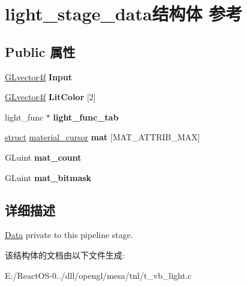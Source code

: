 \hypertarget{structlight__stage__data}{}\section{light\+\_\+stage\+\_\+data结构体 参考}
\label{structlight__stage__data}
\subsection*{Public 属性}
\begin{DoxyCompactItemize}
\item 
\mbox{\label{structlight__stage__data_a8602898d18646f1e2b4eff0319ef4824}} 
\hyperlink{struct_g_lvector4f}{G\+Lvector4f} {\bfseries Input}
\item 
\mbox{\label{structlight__stage__data_a7f84f92269f45218e3ca5165f1d1a837}} 
\hyperlink{struct_g_lvector4f}{G\+Lvector4f} {\bfseries Lit\+Color} \mbox{[}2\mbox{]}
\item 
\mbox{\label{structlight__stage__data_ae8553a68070798719b935d733bfb014d}} 
light\+\_\+func $\ast$ {\bfseries light\+\_\+func\+\_\+tab}
\item 
\mbox{\label{structlight__stage__data_a55126b9a82bb1b05d9358bdb3407adfc}} 
\hyperlink{interfacestruct}{struct} \hyperlink{structmaterial__cursor}{material\+\_\+cursor} {\bfseries mat} \mbox{[}M\+A\+T\+\_\+\+A\+T\+T\+R\+I\+B\+\_\+\+M\+AX\mbox{]}
\item 
\mbox{\label{structlight__stage__data_a05e3d285633834b50cf4d359b15bde97}} 
G\+Luint {\bfseries mat\+\_\+count}
\item 
\mbox{\label{structlight__stage__data_a887772ce304ee7e51621cc1d31689bfb}} 
G\+Luint {\bfseries mat\+\_\+bitmask}
\end{DoxyCompactItemize}


\subsection{详细描述}
\hyperlink{struct_data}{Data} private to this pipeline stage. 

该结构体的文档由以下文件生成\+:\begin{DoxyCompactItemize}
\item 
E\+:/\+React\+O\+S-\/0../dll/opengl/mesa/tnl/t\+\_\+vb\+\_\+light.\+c\end{DoxyCompactItemize}
